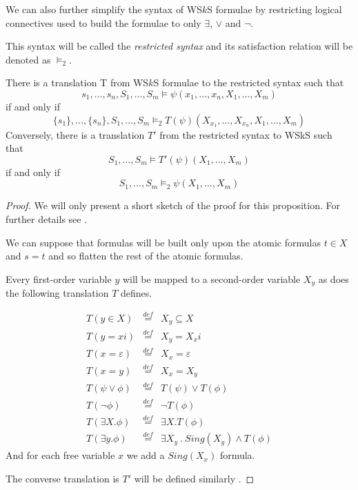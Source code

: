 	We can also further simplify the syntax of WS$k$S formulae by restricting
	logical connectives used to build the formulae to only $\exists$, $\vee$ and $\neg$.
	
	 This syntax will be called
	the \emph{restricted syntax} and its satisfaction relation will be denoted as $\vDash_2$.
	
	\begin{prop}
	There is a translation T from WS$k$S formulae to the restricted syntax such that $$s_1,\ldots,s_n,S_1,\ldots,S_m \vDash \psi(x_1,\ldots,x_n,X_1,\ldots,X_m)$$ if and only if $$\{s_1\},\ldots,\{s_n\},S_1,\ldots,S_m \vDash_2 T(\psi)(X_{x_1},\ldots,X_{x_n}, X_1,\ldots,X_m)$$ Conversely, there is a translation $T'$ from the restricted syntax to WSkS such that $$S_1,\ldots,S_m \vDash T'(\psi)(X_1,\ldots,X_m)$$ if and only if $$S_1,\ldots,S_m \vDash_2 \psi(X_1,\ldots,X_m)$$
	\end{prop}
	\begin{proof}
	We will only present a short sketch of the proof for this proposition. For further details see \cite{tata}.
	
	We can suppose that formulas will be built only upon the atomic formulas $t \in X$ and $s = t$ and so flatten the rest of the atomic formulas.
	
	Every first-order variable $y$ will be mapped to a second-order variable $X_y$ as does the following translation $T$ defines.
	
	 \begin{eqnarray*}
	 T(y \in X) & \overset{def}{=} & X_y \subseteq X\\
	 T(y = xi) & \overset{def}{=} &  X_y = X_xi\\
	 T(x = \varepsilon) & \overset{def}{=} & X_x = \varepsilon\\
	 T(x = y) & \overset{def}{=} & X_x = X_y\\
	 T(\psi \vee \phi) & \overset{def}{=} & T(\psi) \vee T(\phi)\\
	 T(\neg\phi) & \overset{def}{=} & \neg T(\phi)\\
	 T(\exists X.\phi) & \overset{def}{=} & \exists X.T(\phi)\\
	 T(\exists y.\phi) & \overset{def}{=} & \exists X_y\ .\ Sing(X_y) \wedge T(\phi)
	 \end{eqnarray*}
	And for each free variable $x$ we add a $Sing(X_x)$ formula. 
	
	The converse translation is $T'$ will be defined similarly \cite{tata}.
	\end{proof}
	
